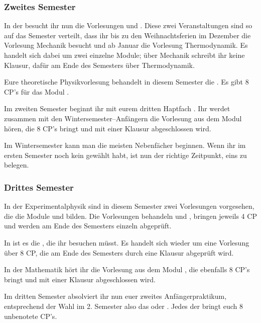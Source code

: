\pagebreak

\subsubsection{Zweites Semester}\label{PhyBa2}
In der  besucht ihr nun die Vorlesungen   und  .
Diese zwei Veranstaltungen sind so auf das Semester verteilt, dass ihr bis zu den Weihnachtsferien im Dezember die Vorlesung Mechanik besucht und ab Januar die Vorlesung Thermodynamik. Es handelt sich dabei um zwei einzelne Module; über Mechanik schreibt ihr keine Klausur, dafür am Ende des Semesters über Thermodynamik.
\bigskip

Eure theoretische Physikvorlesung behandelt in diesem Semester die . Es gibt 8 CP's für das Modul .

Im zweiten Semester beginnt ihr mit eurem dritten Haptfach .
Ihr werdet zusammen mit den Wintersemester--Anfängern die Vorlesung  aus dem Modul  hören, die 8 CP's bringt und mit einer Klausur abgeschlossen wird.
\bigskip

Im Wintersemester kann man die meisten Nebenfächer beginnen. Wenn ihr im ersten Semester noch kein  gewählt habt, ist nun der richtige Zeitpunkt, eins zu belegen.

\subsubsection{Drittes Semester}
In der Experimentalphysik sind in diesem Semester zwei Vorlesungen vorgesehen, die die Module  und  bilden.
Die Vorlesungen behandeln  und , bringen jeweils 4 CP und werden am Ende des Semesters einzeln abgeprüft.
\bigskip

In  ist es die , die ihr besuchen müsst.
Es handelt sich wieder um eine Vorlesung über 8 CP, die am Ende des Semesters durch eine Klausur abgeprüft wird.
\bigskip

In der Mathematik hört ihr die Vorlesung  aus dem Modul , die ebenfalls 8 CP's bringt und mit einer Klausur abgeschlossen wird.
\bigskip

Im dritten Semester absolviert ihr nun euer zweites Anfängerpraktikum, entsprechend der Wahl im 2. Semester also das  oder .
Jedes der  bringt euch 8 unbenotete CP's.

